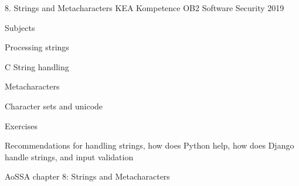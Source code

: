 \documentclass[Screen16to9,17pt]{foils}
\begin{document}
\mytitlepage
{8. Strings and Metacharacters}
{KEA Kompetence OB2 Software Security 2019}


\begin{list1}
\item Subjects
\begin{list2}
\item Processing strings
\item C String handling
\item Metacharacters
\item Character sets and unicode
\end{list2}
\item Exercises
\begin{list2}
\item Recommendations for handling strings, how does Python help, how does Django handle strings, and input validation
\end{list2}
\end{list1}


\begin{list1}
\item AoSSA chapter 8: Strings and Metacharacters
\end{list1}



\begin{list1}
\item
\end{list1}

\end{document}
